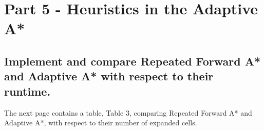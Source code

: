 \documentclass{article}
\begin{document}

\section{Part 5 - Heuristics in the Adaptive A*}

\subsection{ Implement and compare Repeated Forward A* and Adaptive A* with respect to their runtime.}

The next page contains a table, Table 3, comparing Repeated Forward A* and  Adaptive A*, with respect to their number of expanded cells.\\
\end{document}
